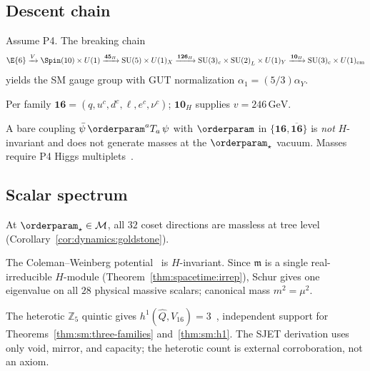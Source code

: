 \subsection{Descent chain}
\label{sec:sm:descent}

\begin{theorem}\label{thm:sm:descent}
Assume P4. The breaking chain
\[
  \E{6}\xrightarrow{V}\Spin(10)\times U(1)
  \xrightarrow{\mathbf{45}_H}\mathrm{SU}(5)\times U(1)_X
  \xrightarrow{\mathbf{126}_H}\mathrm{SU}(3)_c\times\mathrm{SU(2)}_L\times U(1)_Y
  \xrightarrow{\mathbf{10}_H}\mathrm{SU}(3)_c\times U(1)_{\mathrm{em}}
\]
yields the SM gauge group with GUT normalization $\alpha_1=(5/3)\alpha_Y$.
\end{theorem}

Per family $\mathbf{16}=(q,u^c,d^c,\ell,e^c,\nu^c)$; $\mathbf{10}_H$ supplies
$v=246\,\mathrm{GeV}$.

\begin{remark}
A bare coupling $\bar\psi\,\orderparam^a T_a\,\psi$ with $\orderparam$ in
$\{\mathbf{16},\overline{\mathbf{16}}\}$ is \emph{not} $H$-invariant and does not
generate masses at the $\orderparam_\star$ vacuum. Masses require P4 Higgs
multiplets~\cite{GeorgiGlashow1974}.
\end{remark}

\subsection{Scalar spectrum}
\label{sec:sm:masses}

\begin{theorem}\label{thm:sm:tree}
At $\orderparam_\star\in\mathcal{M}$, all $32$ coset directions are massless at
tree level (Corollary~\ref{cor:dynamics:goldstone}).
\end{theorem}

\begin{theorem}\label{thm:sm:radiative}
The Coleman--Weinberg potential~\cite{ColemanWeinberg1973} is $H$-invariant.
Since $\mathfrak{m}$ is a single real-irreducible $H$-module
(Theorem~\ref{thm:spacetime:irrep}), Schur gives one eigenvalue on all $28$
physical massive scalars; canonical mass $m^2=\mu^2$.
\end{theorem}

\begin{remark}\label{rem:sm:heterotic}
The heterotic $\mathbb{Z}_5$ quintic gives $h^1(\hat Q,V_{16})=3$~\cite{Witten1985},
independent support for Theorems~\ref{thm:sm:three-families}
and~\ref{thm:sm:h1}. The SJET derivation uses only void, mirror, and capacity;
the heterotic count is external corroboration, not an axiom.
\end{remark}